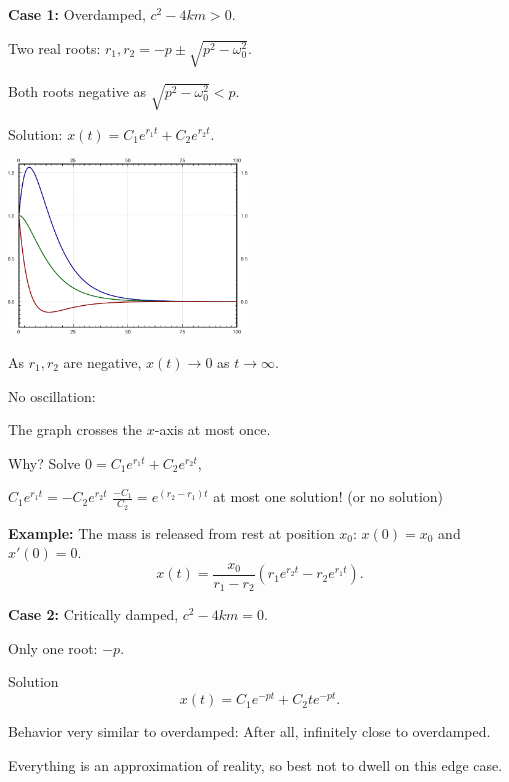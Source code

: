 \documentclass[10pt,aspectratio=169]{beamer}
\begin{document}
\begin{frame}
\textbf{Case 1:}
Overdamped, \quad $c^2-4km > 0$.

\medskip
\pause

Two real roots: \quad $r_1,r_2 = -p \pm \sqrt{p^2 - \omega_0^2}$.

\medskip
\pause

Both roots negative as \quad $\sqrt{p^2 - \omega_0^2} < p$.

\medskip
\pause

Solution: \quad
$x(t) = C_1 e^{r_1 t} + C_2 e^{r_2 t}$.

\vspace*{-1.1in}

\hfill\includegraphics[width=2.5in]{../figures/mv-overdamped}

\vspace*{-0.69in}

\pause
As $r_1,r_2$ are negative, \quad
$x(t) \to 0$ as $t \to \infty$.

\medskip
\pause

No oscillation:

The graph crosses the
$x$-axis at most once.

\pause

Why?  Solve $0 = C_1 e^{r_1 t} + C_2 e^{r_2 t}$,

\pause

\thus\quad $C_1 e^{r_1 t} = - C_2 e^{r_2 t}$
\pause
\wthus
$\frac{-C_1}{C_2} = e^{(r_2-r_1) t}$
\wthus
at most one solution! (or no solution)

\medskip
\pause

\textbf{Example:}
The mass is released from rest at position $x_0$:
$x(0) = x_0$ and $x'(0) = 0$.
\[
x(t) = \frac{x_0}{r_1-r_2} \left(r_1 e^{r_2 t} - r_2 e^{r_1 t} \right) .
\]
\end{frame}

\begin{frame}
\textbf{Case 2:} 
Critically damped, \quad $c^2 - 4km = 0$.

\medskip
\pause

Only one root: \quad $-p$.

\medskip
\pause

Solution
\[
x(t) = C_1 e^{-pt} + C_2 t e^{-pt} .
\]

\medskip
\pause

Behavior very similar to overdamped: After all, infinitely close
to overdamped.

\medskip
\pause

Everything is an approximation of reality,
so best not to dwell on this edge case.

\end{frame}
\end{document}
